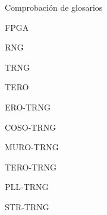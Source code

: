 Comprobación de glosarios

\Gls{FPGA} 

\Gls{RNG} 

\Gls{TRNG}

\Gls{TERO}

\Gls{ERO-TRNG}

\Gls{COSO-TRNG}

\Gls{MURO-TRNG}

\Gls{TERO-TRNG}

\Gls{PLL-TRNG}

\Gls{STR-TRNG}
